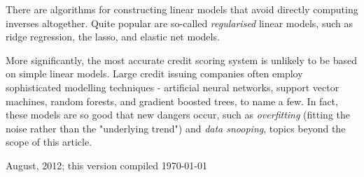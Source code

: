 \documentclass[11pt, reqno]{amsart} \usepackage{hyperlatex}
\begin{document}
There are algorithms for constructing linear models that avoid directly
computing inverses altogether. Quite popular are so-called {\sl
  regularised} linear models, such as ridge regression, the lasso, and
elastic net models. 

More significantly, the most accurate credit scoring system is
unlikely to be based on simple linear models. Large credit issuing
companies often employ sophisticated modelling techniques - artificial
neural networks, support vector machines, random forests, and gradient
boosted trees, to name a few. In fact, these models are so good that
new dangers occur, such as {\em overfitting} (fitting the noise rather
than the "underlying trend") and {\em data snooping}, topics beyond
the scope of this article.





\vfill
\noindent%
August, 2012; this version compiled \today
\end{document}
